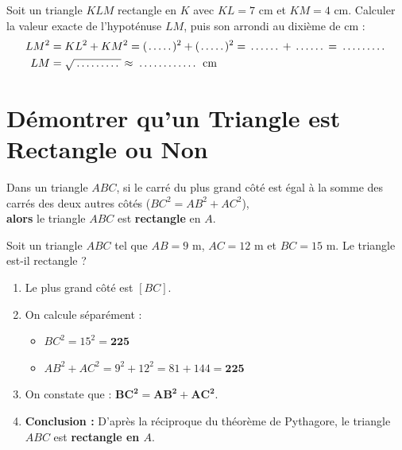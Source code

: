 \begin{cadreexemple}
Soit un triangle $KLM$ rectangle en $K$ avec $KL = 7\text{ cm}$ et $KM = 4\text{ cm}$.
Calculer la valeur exacte de l'hypoténuse $LM$, puis son arrondi au dixième de cm :
\begin{align*}
LM^2 &= KL^2 + KM^2 = (\pointille[0.8cm])^2 + (\pointille[0.8cm])^2 = \pointille[1cm] + \pointille[1cm] = \pointille[1.5cm] \\
LM &= \sqrt{\pointille[1.5cm]} \approx \pointille[2cm]\text{ cm}
\end{align*}
\end{cadreexemple}

\section{Démontrer qu'un Triangle est Rectangle ou Non}

\begin{cadreprop}
Dans un triangle $ABC$, si le carré du plus grand côté est égal à la somme des carrés des deux autres côtés ($BC^2 = AB^2 + AC^2$),\\
\textbf{alors} le triangle $ABC$ est \textbf{rectangle} en $A$.
\end{cadreprop}

\begin{cadremethode}
Soit un triangle $ABC$ tel que $AB = 9\text{ m}$, $AC = 12\text{ m}$ et $BC = 15\text{ m}$. Le triangle est-il rectangle ?
\begin{enumerate}
    \item Le plus grand côté est $[BC]$.
    \item On calcule séparément :
    \begin{itemize}
        \item $BC^2 = 15^2 = \mathbf{225}$
        \item $AB^2 + AC^2 = 9^2 + 12^2 = 81 + 144 = \mathbf{225}$
    \end{itemize}
    \item On constate que : $\mathbf{BC^2 = AB^2 + AC^2}$.
    \item \textbf{Conclusion :} D'après la réciproque du théorème de Pythagore, le triangle $ABC$ est \textbf{rectangle en $A$}.
\end{enumerate}
\end{cadremethode}

